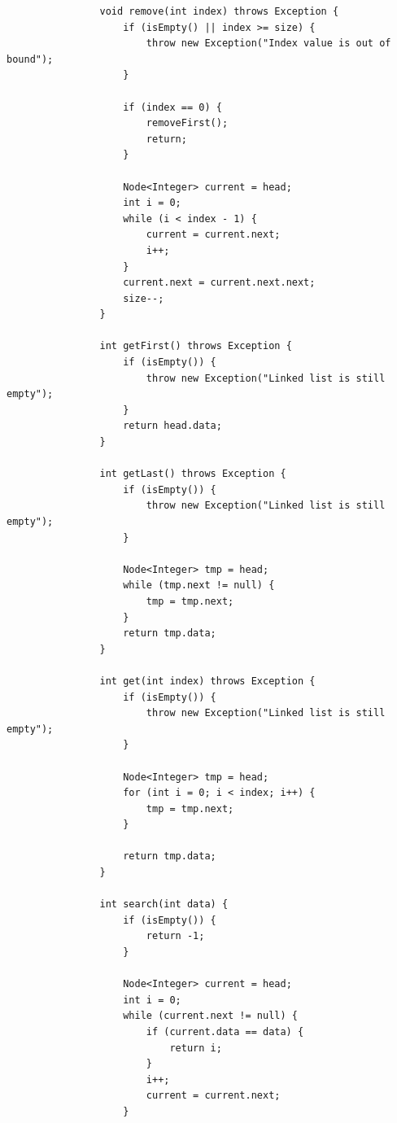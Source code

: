 \documentclass[12pt,titlepage]{article}
\begin{document}
\begin{enumerate}
{\begin{verbatim}
                void remove(int index) throws Exception {
                    if (isEmpty() || index >= size) {
                        throw new Exception("Index value is out of bound");
                    }

                    if (index == 0) {
                        removeFirst();
                        return;
                    }

                    Node<Integer> current = head;
                    int i = 0;
                    while (i < index - 1) {
                        current = current.next;
                        i++;
                    }
                    current.next = current.next.next;
                    size--;
                }

                int getFirst() throws Exception {
                    if (isEmpty()) {
                        throw new Exception("Linked list is still empty");
                    }
                    return head.data;
                }

                int getLast() throws Exception {
                    if (isEmpty()) {
                        throw new Exception("Linked list is still empty");
                    }

                    Node<Integer> tmp = head;
                    while (tmp.next != null) {
                        tmp = tmp.next;
                    }
                    return tmp.data;
                }

                int get(int index) throws Exception {
                    if (isEmpty()) {
                        throw new Exception("Linked list is still empty");
                    }

                    Node<Integer> tmp = head;
                    for (int i = 0; i < index; i++) {
                        tmp = tmp.next;
                    }

                    return tmp.data;
                }

                int search(int data) {
                    if (isEmpty()) {
                        return -1;
                    }

                    Node<Integer> current = head;
                    int i = 0;
                    while (current.next != null) {
                        if (current.data == data) {
                            return i;
                        }
                        i++;
                        current = current.next;
                    }


\end{verbatim}}
\end{enumerate}
\end{document}
